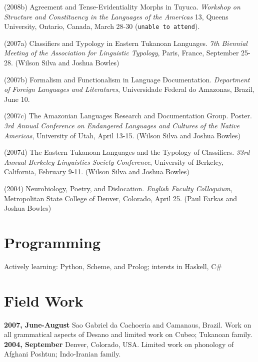 \documentclass[line]{resume}
\begin{document}
\begin{resume}
(2008b) Agreement and Tense-Evidentiality Morphs in Tuyuca. \emph{Workshop on Structure
and Constituency in the Languages of the Americas} 13, Queens University,
Ontario, Canada, March 28-30 (\texttt{unable to attend}).

(2007a) Classifiers and Typology in Eastern Tukanoan Languages. \emph{7th Biennial Meeting of the Association for Linguistic Typology}, Paris, France, September 25-28.
(Wilson Silva and Joshua Bowles)

(2007b) Formalism and Functionalism in Language Documentation. \emph{Department of
Foreign Languages and Literatures}, Universidade Federal do Amazonas, Brazil,
June 10.

(2007c) The Amazonian Languages Research and Documentation Group. Poster. \emph{3rd
Annual Conference on Endangered Languages and Cultures of the Native
Americas}, University of Utah, April 13-15.
(Wilson Silva and Joshua Bowles)

(2007d) The Eastern Tukanoan Languages and the Typology of Classifiers. \emph{33rd Annual Berkeley Linguistics Society Conference}, University of Berkeley, California,
February 9-11. (Wilson Silva and Joshua Bowles)

(2004) Neurobiology, Poetry, and Dislocation. \emph{English Faculty Colloquium}, Metropolitan State College of Denver, Colorado, April 25. (Paul Farkas and Joshua Bowles)

\section{Programming}
Actively learning: Python, Scheme, and Prolog; intersts in Haskell, C\# 


\section{Field Work}
{\bf 2007, June-August} Sao Gabriel da Cachoeria and Camanaus, Brazil. Work on all grammatical aspects of Desano and limited work on Cubeo; Tukanoan family. {\bf 2004, September} Denver, Colorado, USA. Limited work on phonology of Afghani Poshtun; Indo-Iranian family.


 \end{resume}
\end{document}
